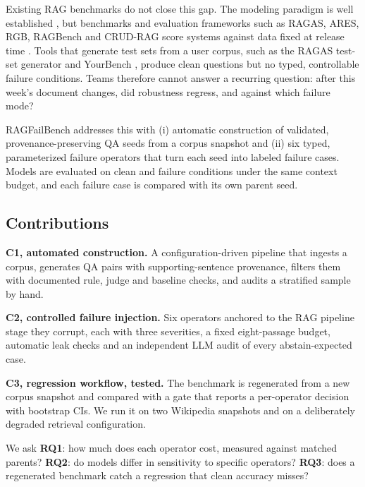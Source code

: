 \documentclass[conference]{IEEEtran}
\begin{document}
Existing RAG benchmarks do not close this gap. The modeling paradigm is well established
\cite{lewis2020rag,gao2023survey,zhao2024survey,huang2024survey}, but benchmarks and evaluation
frameworks such as RAGAS, ARES, RGB, RAGBench and CRUD-RAG score systems against data fixed at
release time \cite{es2024ragas,saadfalcon2024ares,chen2024rgb,friel2024ragbench,lyu2024crud}.
Tools that generate test sets from a user corpus, such as the RAGAS test-set generator and
YourBench \cite{es2024ragas,shashidhar2025yourbench}, produce clean questions but no typed,
controllable failure conditions. Teams therefore cannot answer a recurring question: after this
week's document changes, did robustness regress, and against which failure mode?

RAGFailBench addresses this with (i) automatic construction of validated,
provenance-preserving QA seeds from a corpus snapshot and (ii) six typed, parameterized failure
operators that turn each seed into labeled failure cases. Models are evaluated on clean and
failure conditions under the same context budget, and each failure case is compared with its
own parent seed.

\subsection{Contributions}
\textbf{C1, automated construction.} A configuration-driven pipeline that ingests a corpus,
generates QA pairs with supporting-sentence provenance, filters them with documented rule,
judge and baseline checks, and audits a stratified sample by hand.

\textbf{C2, controlled failure injection.} Six operators anchored to the RAG pipeline stage they
corrupt, each with three severities, a fixed eight-passage budget, automatic leak checks and an
independent LLM audit of every abstain-expected case.

\textbf{C3, regression workflow, tested.} The benchmark is regenerated from a new corpus
snapshot and compared with a gate that reports a per-operator decision with bootstrap CIs. We
run it on two Wikipedia snapshots and on a deliberately degraded retrieval configuration.

We ask \textbf{RQ1}: how much does each operator cost, measured against matched parents?
\textbf{RQ2}: do models differ in sensitivity to specific operators? \textbf{RQ3}: does a
regenerated benchmark catch a regression that clean accuracy misses?
\end{document}
